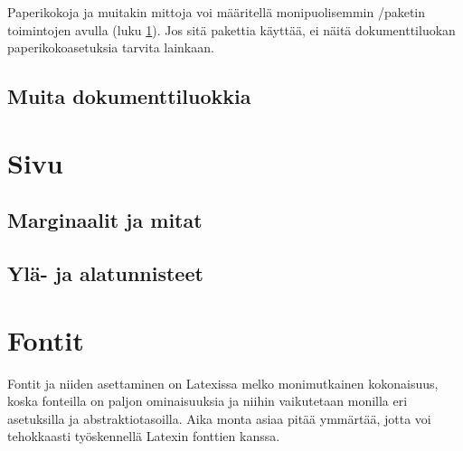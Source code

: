 
Paperikokoja ja muitakin mittoja voi määritellä monipuolisemmin
\-/paketin toimintojen avulla (luku
\ref{luku:sivuasetukset}). Jos sitä pakettia käyttää, ei näitä
dokumenttiluokan paperi\-koko\-ase\-tuk\-sia tarvita lainkaan.

\subsection{Muita dokumenttiluokkia}

\section{Sivu}
\label{luku:sivuasetukset}
\subsection{Marginaalit ja mitat}
\subsection{Ylä- ja alatunnisteet}

\section{Fontit}
\label{luku:kirjaintyypit}

Fontit ja niiden asettaminen on Latexissa melko monimutkainen
kokonaisuus, koska fonteilla on paljon ominaisuuksia ja niihin
vaikutetaan monilla eri asetuksilla ja abstraktiotasoilla. Aika monta
asiaa pitää ymmärtää, jotta voi tehokkaasti työskennellä Latexin
fonttien kanssa.


